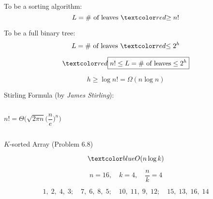 \begin{frame}{}
  \centering

  \pause
  \vspace{0.30cm}
  \begin{alertblock}{To be a  sorting algorithm:}
    \[
      L = \# \text{ of leaves } \red{\ge}\; n!
    \]
  \end{alertblock}

  \pause
  \vspace{0.50cm}
  \begin{alertblock}{To be a full binary tree:}
    \[
      L = \# \text{ of leaves } \red{\le}\; 2^h
    \]
  \end{alertblock}
\end{frame}

\begin{frame}{}
  \[
	\red{\boxed{n! \le L = \# \text{ of leaves} \le 2^h}}
  \]

  \pause
  \vspace{0.60cm}
  \[
    h \ge \log n! = \Omega(n \log n)
  \]

  \pause
  \vspace{0.60cm}
  \begin{alertblock}{Stirling Formula (by {\it James Stirling}):}
    \begin{columns}
    \[
      n! = \Theta\Big(\sqrt{2 \pi n} \Big(\frac{n}{e}\Big)^{n}\Big)
    \]
    \end{columns}
  \end{alertblock}
\end{frame}

\begin{frame}{}
  \begin{exampleblock}{$K$-sorted Array (Problem $6.8$)}

	\pause
    \vspace{-0.50cm}
	\[
	  \blue{O(n \log k)}
	\]
  \end{exampleblock}

  \pause
  \[
    n = 16,\quad k = 4,\quad \frac{n}{k} = 4
  \]

  \[
    1,\;2,\;4,\;3;\quad 7,\;6,\;8,\;5;\quad 10,\;11,\;9,\;12;\quad 15,\;13,\;16,\;14
  \]
\end{frame}

